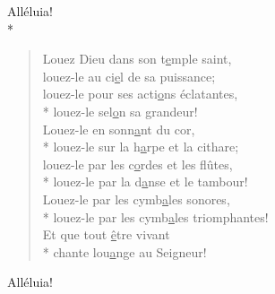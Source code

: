 Alléluia! \\*

\begin{verse}
Louez Dieu dans son t\underline{e}mple saint, \\
louez-le au ci\underline{e}l de sa puissance; \\
louez-le pour ses acti\underline{o}ns éclatantes, \\*
louez-le sel\underline{o}n sa grandeur! \\

Louez-le en sonn\underline{a}nt du cor, \\*
louez-le sur la h\underline{a}rpe et la cithare; \\
louez-le par les c\underline{o}rdes et les flûtes, \\*
louez-le par la d\underline{a}nse et le tambour! \\

Louez-le par les cymb\underline{a}les sonores, \\*
louez-le par les cymb\underline{a}les triomphantes! \\
Et que tout \underline{ê}tre vivant \\*
chante lou\underline{a}nge au Seigneur! \\
\end{verse}

Alléluia! \\
